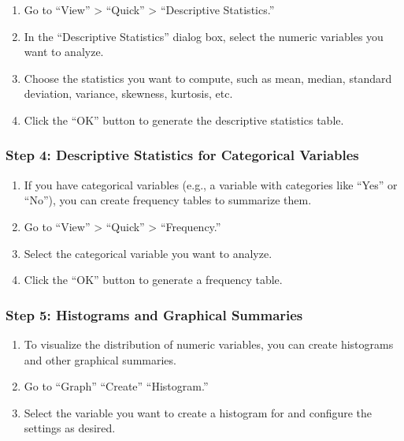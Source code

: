 \documentclass[
  letterpaper,
  DIV=11,
  numbers=noendperiod]{scrartcl}
\providecommand{\tightlist}{%
  \setlength{\itemsep}{0pt}\setlength{\parskip}{0pt}}\usepackage{longtable,booktabs,array}
\begin{document}
\begin{enumerate}
\def\labelenumi{\arabic{enumi}.}
\tightlist
\item
  Go to ``View'' \textgreater{} ``Quick'' \textgreater{} ``Descriptive
  Statistics.''
\item
  In the ``Descriptive Statistics'' dialog box, select the numeric
  variables you want to analyze.
\item
  Choose the statistics you want to compute, such as mean, median,
  standard deviation, variance, skewness, kurtosis, etc.
\item
  Click the ``OK'' button to generate the descriptive statistics table.
\end{enumerate}

\hypertarget{step-4-descriptive-statistics-for-categorical-variables}{%
\subsubsection{\texorpdfstring{\textbf{Step 4: Descriptive Statistics
for Categorical
Variables}}{Step 4: Descriptive Statistics for Categorical Variables}}\label{step-4-descriptive-statistics-for-categorical-variables}}

\begin{enumerate}
\def\labelenumi{\arabic{enumi}.}
\tightlist
\item
  If you have categorical variables (e.g., a variable with categories
  like ``Yes'' or ``No''), you can create frequency tables to summarize
  them.
\item
  Go to ``View'' \textgreater{} ``Quick'' \textgreater{} ``Frequency.''
\item
  Select the categorical variable you want to analyze.
\item
  Click the ``OK'' button to generate a frequency table.
\end{enumerate}

\hypertarget{step-5-histograms-and-graphical-summaries}{%
\subsubsection{\texorpdfstring{\textbf{Step 5: Histograms and Graphical
Summaries}}{Step 5: Histograms and Graphical Summaries}}\label{step-5-histograms-and-graphical-summaries}}

\begin{enumerate}
\def\labelenumi{\arabic{enumi}.}
\item
  To visualize the distribution of numeric variables, you can create
  histograms and other graphical summaries.
\item
  Go to ``Graph'' ``Create'' ``Histogram.''
\item
  Select the variable you want to create a histogram for and configure
  the settings as desired.
\end{enumerate}
\end{document}
